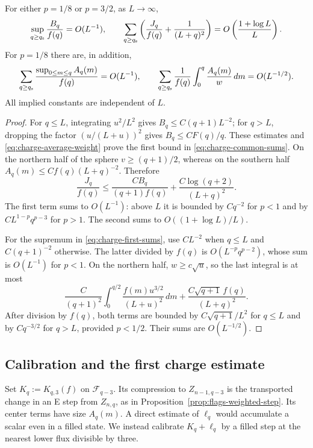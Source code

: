 \begin{lemma}\label{lem:charge-sums}
For either $p=1/8$ or $p=3/2$, as $L\to\infty$,
\begin{equation}\label{eq:charge-common-sums}
 \sup_{q\ge q_{\rm s}}\frac{B_q}{f(q)}=O(L^{-1}),\qquad
 \sum_{q\ge q_{\rm s}}
 \left(\frac{J_q}{f(q)}+\frac1{(L+q)^2}\right)
 =O\left(\frac{1+\log L}{L}\right).
\end{equation}
For $p=1/8$ there are, in addition,
\begin{equation}\label{eq:charge-first-sums}
 \sum_{q\ge q_{\rm s}}
 \frac{\sup_{0\le m\le q}A_q(m)}{f(q)}=O(L^{-1}),\qquad
 \sum_{q\ge q_{\rm s}}\frac1{f(q)}
 \int_0^q\frac{A_q(m)}w\,dm=O(L^{-1/2}).
\end{equation}
All implied constants are independent of $L$.
\end{lemma}

\begin{proof}
For $q\le L$, integrating $u^2/L^2$ gives
$B_q\le C(q+1)L^{-2}$; for $q>L$, dropping the factor
$(u/(L+u))^2$ gives $B_q\le C F(q)/q$.
These estimates and \eqref{eq:charge-average-weight} prove the first
bound in \eqref{eq:charge-common-sums}.
On the northern half of the sphere $v\ge(q+1)/2$, whereas on the
southern half $A_q(m)\le C f(q)(L+q)^{-2}$.  Therefore
\[
 \frac{J_q}{f(q)}\le
 \frac{C B_q}{(q+1)f(q)}+
 \frac{C\log(q+2)}{(L+q)^2}.
\]
The first term sums to $O(L^{-1})$: above $L$ it is bounded by
$Cq^{-2}$ for $p<1$ and by $CL^{1-p}q^{p-3}$ for $p>1$.
The second sums to $O((1+\log L)/L)$.

For the supremum in \eqref{eq:charge-first-sums}, use $CL^{-2}$
when $q\le L$ and $C(q+1)^{-2}$ otherwise.  The latter divided by
$f(q)$ is $O(L^{-p}q^{p-2})$, whose sum is $O(L^{-1})$ for $p<1$.
On the northern half, $w\ge c\sqrt u$, so the last integral is at
most
\[
 \frac{C}{(q+1)^2}\int_0^{q/2}
 \frac{f(m)u^{3/2}}{(L+u)^2}\,dm
 +\frac{C\sqrt{q+1}\,f(q)}{(L+q)^2}.
\]
After division by $f(q)$, both terms are bounded by
$C\sqrt{q+1}/L^2$ for $q\le L$ and by $Cq^{-3/2}$ for $q>L$,
provided $p<1/2$.  Their sums are $O(L^{-1/2})$.
\end{proof}

\subsection{Calibration and the first charge estimate}

Set $K_q:=K_{q,3}(f)$ on $\mathcal F_{q-3}$.  Its compression to
$Z_{n-1,q-3}$ is the transported change in an E step from $Z_{n,q}$,
as in Proposition~\ref{prop:flags-weighted-step}.  Its center terms
have size $A_q(m)$.  A direct estimate of $\ell_q$ would accumulate a scalar
even in a filled state.  We instead calibrate $K_q+\ell_q$ by a
filled step at the nearest lower flux divisible by three.

